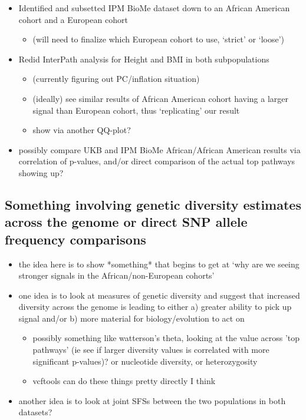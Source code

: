 \documentclass[12pt, a4paper]{article}
\begin{document}
\begin{itemize}
    \item Identified and subsetted IPM BioMe dataset down to an African American cohort and a European cohort
    \begin{itemize}
        \item (will need to finalize which European cohort to use, `strict' or `loose')
    \end{itemize}
    \item Redid InterPath analysis for Height and BMI in both subpopulations
    \begin{itemize}
        \item (currently figuring out PC/inflation situation)
        \item (ideally) see similar results of African American cohort having a larger signal than European cohort, thus `replicating' our result
        \item show via another QQ-plot?
      \end{itemize}
    \item possibly compare UKB and IPM BioMe African/African American results via correlation of p-values, and/or direct comparison of the actual top pathways showing up?
    
\end{itemize}

\subsection{Something involving genetic diversity estimates across the genome or direct SNP allele frequency comparisons}\label{InterPath-Results-IPMBioMeReplication}

\begin{itemize}
    \item the idea here is to show *something* that begins to get at `why are we seeing stronger signals in the African/non-European cohorts'
    \item one idea is to look at measures of genetic diversity and suggest that increased diversity across the genome is leading to either a) greater ability to pick up signal and/or b) more material for biology/evolution to act on
    \begin{itemize}
        \item possibly something like watterson's theta, looking at the value across 'top pathways' (ie see if larger diversity values is correlated with more significant p-values)? or nucleotide diversity, or heterozygosity
        \item vcftools can do these things pretty directly I think
    \end{itemize}
    \item another idea is to look at joint SFSs between the two populations in both datasets? 
\end{itemize}


\fi
\end{document}
